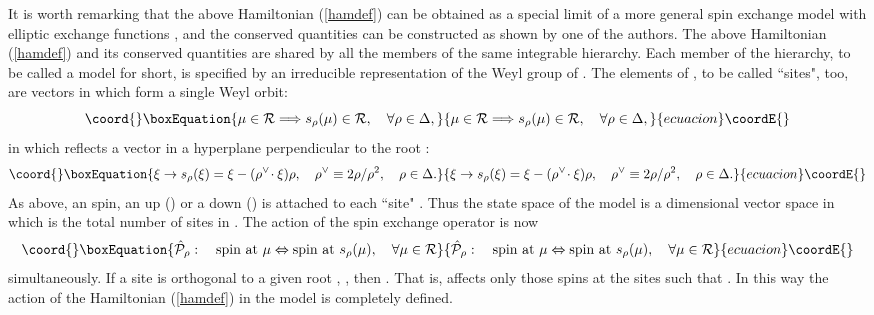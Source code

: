 \documentclass[a4paper,12pt]{article}
\begin{document}
It is worth remarking that the above Hamiltonian (\ref{hamdef})
can be obtained as
a special limit of a more general spin exchange model with elliptic exchange
functions \cite{ino1}, and the conserved quantities can be constructed
\cite{ino2}
as shown by one of the authors. The above Hamiltonian (\ref{hamdef}) and its
conserved quantities are shared by all the members of the same integrable
hierarchy.
Each member of the hierarchy,  to be called a model \coordHE{} for short, is
specified by an irreducible representation \coordHE{} of the Weyl group of
\coordHE{}.
The elements of \coordHE{}, to be called ``sites", too, are vectors in
\coordHE{} which form a single Weyl orbit:
\begin{equation}\coord{}\boxEquation{
\mu\in{\cal R}\Longrightarrow s_{\rho}(\mu)\in{\cal R},\quad
 \forall\rho\in\Delta,
}{
\mu\in{\cal R}\Longrightarrow s_{\rho}(\mu)\in{\cal R},\quad
 \forall\rho\in\Delta,
}{ecuacion}\coordE{}\end{equation}
in which \coordHE{} reflects
a vector \coordHE{} in a hyperplane perpendicular to the root
\myHighlight{$\rho$}\coordHE{}:
\begin{equation}\coord{}\boxEquation{
\xi\to s_\rho(\xi)=\xi-(\rho^\vee\!\cdot\xi)\rho,\quad
\rho^\vee\equiv 2\rho/\rho^2,\quad \rho\in\Delta.
}{
\xi\to s_\rho(\xi)=\xi-(\rho^\vee\!\cdot\xi)\rho,\quad
\rho^\vee\equiv 2\rho/\rho^2,\quad \rho\in\Delta.
}{ecuacion}\coordE{}\end{equation}
As above, an \coordHE{} spin, an up (\myHighlight{$\uparrow$}\coordHE{})
or a down (\myHighlight{$\downarrow$}\coordHE{}) is attached
to each ``site" \myHighlight{$\mu$}\coordHE{}. Thus the state space of the
model \coordHE{} is a \coordHE{}
dimensional vector space in which \coordHE{} is the total
number of sites in \coordHE{}.
The action of the spin exchange operator
\coordHE{} is now
\begin{equation}\coord{}\boxEquation{
\hat{\cal P}_\rho:\quad \mbox{spin at}\ \mu\Leftrightarrow
\mbox{spin at}\ s_\rho(\mu),\quad \forall\mu\in{\cal R}
}{
\hat{\cal P}_\rho:\quad \mbox{spin at}\ \mu\Leftrightarrow
\mbox{spin at}\ s_\rho(\mu),\quad \forall\mu\in{\cal R}
}{ecuacion}\coordE{}\end{equation}
simultaneously. If a site \myHighlight{$\mu$}\coordHE{} is orthogonal to a given root \myHighlight{$\rho$}\coordHE{},
\coordHE{}, then \coordHE{}.
That is, \coordHE{} affects only those spins at
the sites \myHighlight{$\mu$}\coordHE{} such that
\coordHE{}.
In this way the action of the Hamiltonian (\ref{hamdef}) in
the model
\coordHE{} is completely defined.
\end{document}
